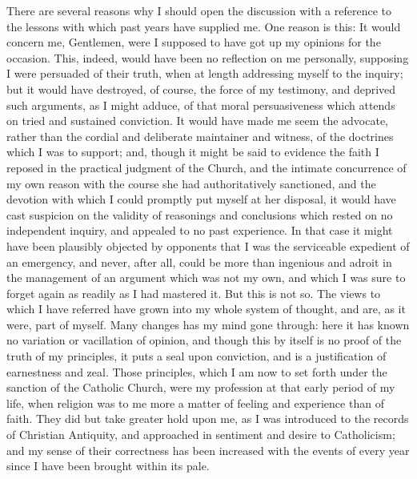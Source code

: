 There are several reasons why I should open the discussion with a
reference to the lessons with which past years have supplied me. One
reason is this: It would concern me, Gentlemen, were I supposed to
have got up my opinions for the occasion. This, indeed, would have
been no reflection on me personally, supposing I were persuaded of
their truth, when at length addressing myself to the inquiry; but it
would have destroyed, of course, the force of my testimony, and
deprived such arguments, as I might adduce, of that moral
persuasiveness which attends on tried and sustained conviction. It
would have made me seem the advocate, rather than the cordial and
deliberate maintainer and witness, of the doctrines which I was to
support; and, though it might be said to evidence the faith I reposed
in the practical judgment of the Church, and the intimate
concurrence of my own reason with the course she had authoritatively
sanctioned, and the devotion with which I could promptly put myself at
her disposal, it would have cast suspicion on the validity of
reasonings and conclusions which rested on no independent inquiry, and
appealed to no past experience. In that case it might have been
plausibly objected by opponents that I was the serviceable expedient
of an emergency, and never, after all, could be more than ingenious
and adroit in the management of an argument which was not my own, and
which I was sure to forget again as readily as I had mastered it. But
this is not so. The views to which I have referred have grown into my
whole system of thought, and are, as it were, part of myself. Many
changes has my mind gone through: here it has known no variation or
vacillation of opinion, and though this by itself is no proof of the
truth of my principles, it puts a seal upon conviction, and is a
justification of earnestness and zeal. Those principles, which I am
now to set forth under the sanction of the Catholic Church, were my
profession at that early period of my life, when religion was to me
more a matter of feeling and experience than of faith. They did but
take greater hold upon me, as I was introduced to the records of
Christian Antiquity, and approached in sentiment and desire to
Catholicism; and my sense of their correctness has been increased with
the events of every year since I have been brought within its pale.

